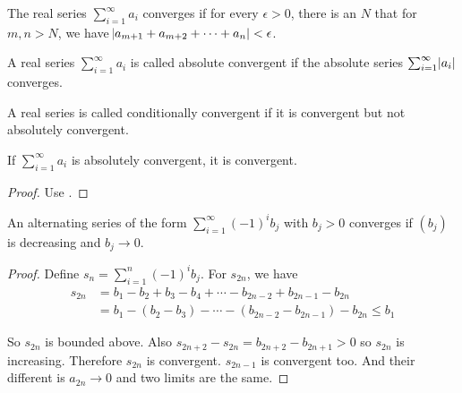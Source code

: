 \begin{theorem}\label{cauchy_convergent_criterion}
    The real series $\sum_{i=1}^\infty a_i$ converges if for every $\epsilon > 0$, there is an $N$ that for $m,n > N$, we have $\abs{a_{m+1} + a_{m+2} + \cdots + a_n} < \epsilon$.
\end{theorem}

\begin{definition}
    A real series $\sum_{i=1}^\infty a_i$ is called absolute convergent if the absolute series $\sum_{i=1}^\infty \abs{a_i}$ converges.
\end{definition}

\begin{definition}
    A real series is called conditionally convergent if it is convergent but not absolutely convergent.
\end{definition}

\begin{theorem}
    If $\sum_{i=1}^\infty a_i$ is absolutely convergent, it is convergent.
\end{theorem}
\begin{proof}
    Use .
\end{proof}

\begin{theorem}
    An alternating series of the form $\sum_{i=1}^\infty (-1)^i b_j$ with $b_j > 0$ converges if $(b_j)$ is decreasing and $b_j \rightarrow 0$.
\end{theorem}
\begin{proof}
    Define $s_n = \sum_{i=1}^n (-1)^i b_j$. For $s_{2n}$, we have
    \begin{equation}
        \begin{aligned}
            s_{2n} &= b_1 - b_2 + b_3 - b_4 + \cdots -b_{2n-2} + b_{2n-1} - b_{2n} \\
            &= b_1 - (b_2 - b_3) - \cdots - (b_{2n-2} - b_{2n-1}) - b_{2n} \leq b_1
        \end{aligned}
    \end{equation}
    
    So $s_{2n}$ is bounded above. Also $s_{2n+2} - s_{2n} = b_{2n+2} - b_{2n+1} > 0$ so $s_{2n}$ is increasing. Therefore $s_{2n}$ is convergent. $s_{2n-1}$ is convergent too. And their different is $a_{2n} \rightarrow 0$ and two limits are the same.
\end{proof}


